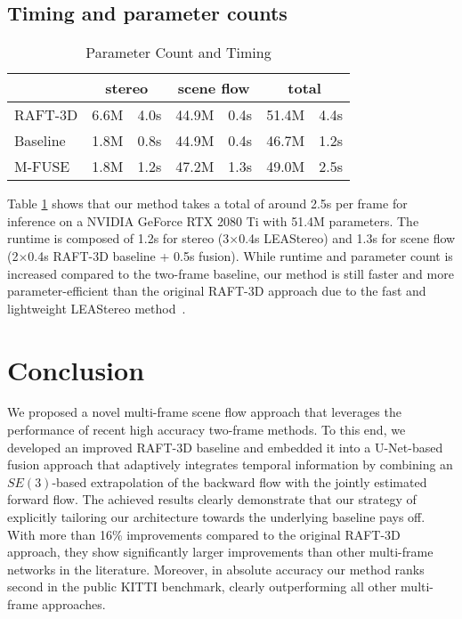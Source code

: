 \documentclass[10pt,twocolumn,letterpaper]{article}
\begin{document}
\subsection{Timing and parameter counts}


\begin{table}
\setlength\tabcolsep{3.5pt}
\caption{Parameter Count and Timing}
\label{tab:paramcount}
\begin{center}
\begin{tabular}{lcccccc}
\toprule
& \multicolumn{2}{c}{stereo} & \multicolumn{2}{c}{scene flow} & \multicolumn{2}{c}{total}
\\
\midrule
RAFT-3D\;\; & 6.6M & 4.0s\;\; & 44.9M & 0.4s\;\; & 51.4M & 4.4s
\\
Baseline & 1.8M & 0.8s\;\; & 44.9M & 0.4s\;\; & 46.7M & 1.2s
\\
M-FUSE & 1.8M & 1.2s\;\; & 47.2M & 1.3s\;\; & 49.0M & 2.5s
\\
\bottomrule
\end{tabular}
\end{center}
\end{table}



Table \ref{tab:paramcount} shows that our method takes a total of around 2.5s per frame for inference on a NVIDIA GeForce RTX 2080 Ti with 51.4M parameters.
The runtime is composed of 1.2s for stereo (3$\times$0.4s LEAStereo) and 1.3s for scene flow (2$\times$0.4s RAFT-3D baseline + 0.5s fusion).
While runtime and parameter count is increased compared to the two-frame baseline, our method is still faster and more parameter-efficient than the original RAFT-3D approach due to the fast and lightweight LEAStereo method~\cite{Cheng2020_LEAStereo}.





\section{Conclusion}
We proposed a novel multi-frame scene flow approach that leverages the performance of recent high accuracy two-frame methods. To this end, we developed an improved RAFT-3D baseline and embedded it into a U-Net-based fusion approach that adaptively integrates temporal information by combining an $SE(3)$-based extrapolation of the backward flow with the jointly estimated forward flow. 
The achieved results clearly demonstrate that our strategy of explicitly tailoring our architecture towards the underlying baseline pays off.
With more than 16\% improvements compared to the original RAFT-3D approach, they show significantly larger improvements than other multi-frame networks in the literature. Moreover, in absolute accuracy  
our method ranks second in the public KITTI benchmark, clearly outperforming all other multi-frame approaches. 
\end{document}
